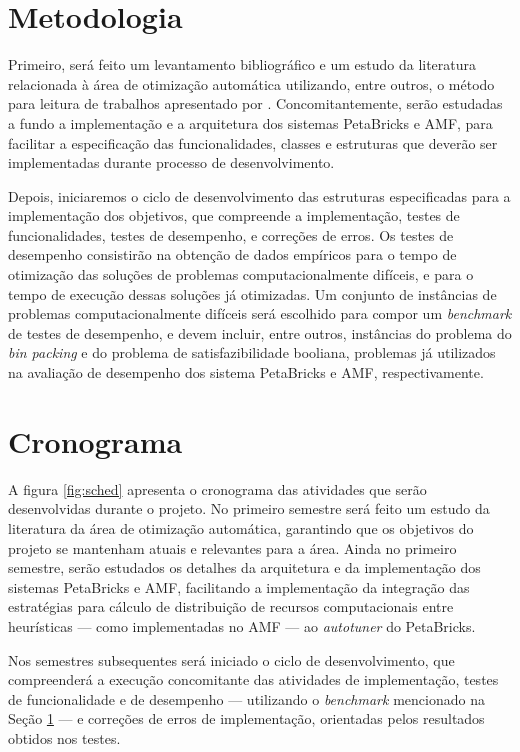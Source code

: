 \documentclass[a4paper, 11pt]{article}
\begin{document}
\section{Metodologia} \label{sec:met}

Primeiro, será feito um levantamento bibliográfico e um estudo da literatura 
relacionada à área de otimização automática utilizando, entre outros, o método 
para leitura de trabalhos apresentado por \citet{keshav2007howtoread}. 
Concomitantemente, serão  estudadas a fundo a implementação e a arquitetura dos
sistemas PetaBricks e AMF, para facilitar a especificação das funcionalidades,
classes e estruturas que deverão ser implementadas durante processo de 
desenvolvimento.

Depois, iniciaremos o ciclo de desenvolvimento das estruturas especificadas
para a implementação dos objetivos, que compreende a implementação, 
testes de funcionalidades, testes de desempenho, e correções de erros.
Os testes de desempenho consistirão na obtenção de dados empíricos para o tempo
de otimização das soluções de problemas computacionalmente difíceis, e para o 
tempo de execução dessas soluções já otimizadas. Um conjunto de instâncias de 
problemas computacionalmente difíceis será escolhido para compor
um \emph{benchmark} de testes de desempenho, e devem incluir, entre outros, 
instâncias do problema do \emph{bin packing} e do problema de satisfazibilidade
booliana, problemas já utilizados na avaliação de desempenho dos sistema 
PetaBricks e AMF, respectivamente.

\section{Cronograma} \label{sec:sched}

A figura \ref{fig:sched} apresenta o cronograma das atividades que serão
desenvolvidas durante o projeto. No primeiro semestre será feito um estudo 
da literatura da área de otimização automática, garantindo que os objetivos 
do projeto se mantenham atuais e relevantes para a área. Ainda no primeiro 
semestre, serão estudados os detalhes da arquitetura e da implementação dos 
sistemas PetaBricks e AMF, facilitando a implementação da integração das 
estratégias para cálculo de distribuição de recursos computacionais entre 
heurísticas --- como implementadas no AMF --- ao \emph{autotuner} 
do PetaBricks.

Nos semestres subsequentes será iniciado o ciclo de desenvolvimento, que 
compreenderá a execução concomitante das atividades de implementação, testes de
funcionalidade e de desempenho --- utilizando o \textit{benchmark} 
mencionado na Seção \ref{sec:met} --- e correções de erros de
implementação, orientadas pelos resultados obtidos nos testes.
\end{document}
